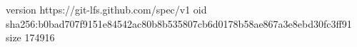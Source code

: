 version https://git-lfs.github.com/spec/v1
oid sha256:b0bad707f9151e84542ac80b8b535807cb6d0178b58ae867a3e8ebd30fc3ff91
size 174916
